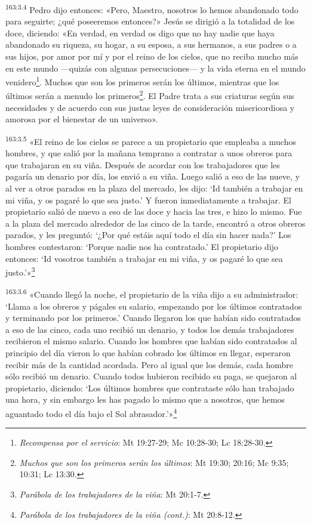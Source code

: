 \par
\textsuperscript{163:3.4} Pedro dijo entonces: «Pero, Maestro, nosotros lo hemos abandonado todo para seguirte; ¿qué poseeremos entonces?» Jesús se dirigió a la totalidad de los doce, diciendo: «En verdad, en verdad os digo que no hay nadie que haya abandonado su riqueza, su hogar, a su esposa, a sus hermanos, a sus padres o a sus hijos, por amor por mí y por el reino de los cielos, que no reciba mucho más en este mundo ---quizás con algunas persecuciones--- y la vida eterna en el mundo venidero\footnote{\textit{Recompensa por el servicio}: Mt 19:27-29; Mc 10:28-30; Lc 18:28-30.}. Muchos que son los primeros serán los últimos, mientras que los últimos serán a menudo los primeros\footnote{\textit{Muchos que son los primeros serán los últimos}: Mt 19:30; 20:16; Mc 9:35; 10:31; Lc 13:30.}. El Padre trata a sus criaturas según sus necesidades y de acuerdo con sus justas leyes de consideración misericordiosa y amorosa por el bienestar de un universo».

\par
\textsuperscript{163:3.5} «El reino de los cielos se parece a un propietario que empleaba a muchos hombres, y que salió por la mañana temprano a contratar a unos obreros para que trabajaran en su viña. Después de acordar con los trabajadores que les pagaría un denario por día, los envió a su viña. Luego salió a eso de las nueve, y al ver a otros parados en la plaza del mercado, les dijo: `Id también a trabajar en mi viña, y os pagaré lo que sea justo.' Y fueron inmediatamente a trabajar. El propietario salió de nuevo a eso de las doce y hacia las tres, e hizo lo mismo. Fue a la plaza del mercado alrededor de las cinco de la tarde, encontró a otros obreros parados, y les preguntó: `¿Por qué estáis aquí todo el día sin hacer nada?' Los hombres contestaron: `Porque nadie nos ha contratado.' El propietario dijo entonces: `Id vosotros también a trabajar en mi viña, y os pagaré lo que sea justo.'»\footnote{\textit{Parábola de los trabajadores de la viña}: Mt 20:1-7.}

\par
\textsuperscript{163:3.6} «Cuando llegó la noche, el propietario de la viña dijo a su administrador: `Llama a los obreros y págales su salario, empezando por los últimos contratados y terminando por los primeros.' Cuando llegaron los que habían sido contratados a eso de las cinco, cada uno recibió un denario, y todos los demás trabajadores recibieron el mismo salario. Cuando los hombres que habían sido contratados al principio del día vieron lo que habían cobrado los últimos en llegar, esperaron recibir más de la cantidad acordada. Pero al igual que los demás, cada hombre sólo recibió un denario. Cuando todos hubieron recibido su paga, se quejaron al propietario, diciendo: `Los últimos hombres que contrataste sólo han trabajado una hora, y sin embargo les has pagado lo mismo que a nosotros, que hemos aguantado todo el día bajo el Sol abrasador.'»\footnote{\textit{Parábola de los trabajadores de la viña (cont.)}: Mt 20:8-12.}

